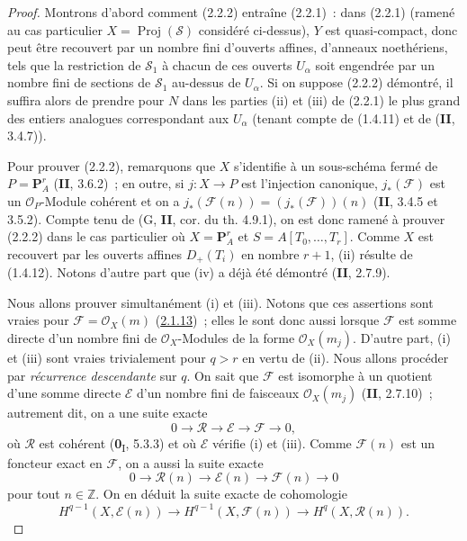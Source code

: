 \begin{proof}
Montrons d'abord comment (2.2.2) entraîne (2.2.1)~: dans (2.2.1)
(ramené au cas particulier $X=\operatorname{Proj}(\mathcal S)$ considéré
ci-dessus), $Y$ est quasi-compact, donc peut être recouvert par un nombre
fini d'ouverts affines, d'anneaux noethériens, tels que la restriction de
$\mathcal S_1$ à chacun de ces ouverts $U_\alpha$ soit engendrée par un
nombre fini de sections de $\mathcal S_1$ au-dessus de $U_\alpha$. Si on
suppose (2.2.2) démontré, il suffira alors de prendre pour $N$ dans les
parties (ii) et (iii) de (2.2.1) le plus grand des entiers analogues
correspondant aux $U_\alpha$ (tenant compte de (1.4.11) et de
(\textbf{II}, 3.4.7)).

Pour prouver (2.2.2), remarquons que $X$ s'identifie à un sous-schéma
fermé de $P=\mathbf P_A^r$ (\textbf{II}, 3.6.2)~; en outre, si $j:X\to P$ est
l'injection canonique, $j_*(\mathcal F)$ est un
$\mathcal O_P$-Module cohérent et on a
$j_*(\mathcal F(n))=(j_*(\mathcal F))(n)$ (\textbf{II}, 3.4.5 et 3.5.2).
Compte tenu de (G, \textbf{II}, cor. du th. 4.9.1), on est donc ramené à prouver
(2.2.2) dans le cas particulier où
$X=\mathbf P_A^r$ et $S=A[T_0,\ldots,T_r]$.
Comme $X$ est recouvert par les ouverts
affines $D_+(T_i)$ en nombre
$r+1$, (ii) résulte de (1.4.12). Notons d'autre part que (iv) a déjà été
démontré (\textbf{II}, 2.7.9).

Nous allons prouver simultanément (i) et (iii). Notons que ces assertions
sont vraies pour $\mathcal F=\mathcal O_X(m)$
(\hyperref[III.2.1.13-fr]{2.1.13})~; elles le sont donc aussi lorsque
$\mathcal F$ est somme directe d'un nombre fini de
$\mathcal O_X$-Modules de la forme $\mathcal O_X(m_j)$. D'autre part,
(i) et (iii) sont vraies trivialement pour $q>r$ en vertu de (ii). Nous
allons procéder par \emph{récurrence descendante} sur $q$. On sait que
$\mathcal F$ est isomorphe à un quotient d'une somme directe $\mathcal E$
d'un nombre fini de faisceaux $\mathcal O_X(m_j)$ (\textbf{II}, 2.7.10)~;
autrement dit, on a une suite exacte
\[
0\longrightarrow\mathcal R\longrightarrow\mathcal E
\longrightarrow\mathcal F\longrightarrow0,
\]
où $\mathcal R$ est cohérent (\textbf{0}\textsubscript{I}, 5.3.3) et où
$\mathcal E$ vérifie (i) et (iii). Comme $\mathcal F(n)$ est un foncteur
exact en $\mathcal F$, on a aussi la suite exacte
\[
0\longrightarrow\mathcal R(n)\longrightarrow\mathcal E(n)
\longrightarrow\mathcal F(n)\longrightarrow0
\]
pour tout $n\in\mathbb Z$. On en déduit la suite exacte de cohomologie
\[
H^{q-1}(X,\mathcal E(n))\longrightarrow
H^{q-1}(X,\mathcal F(n))\longrightarrow
H^q(X,\mathcal R(n)).
\]


\end{proof}
